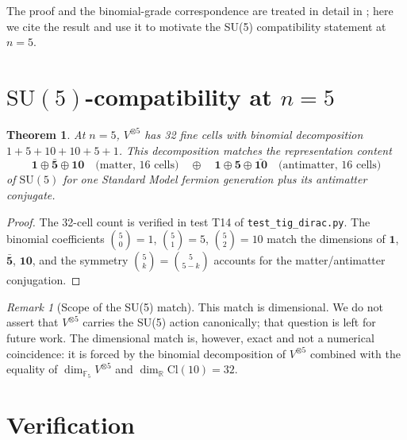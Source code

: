 \documentclass[11pt,reqno]{amsart}
\theoremstyle{plain}
\newtheorem{theorem}{Theorem}[section]
\theoremstyle{definition}
\theoremstyle{remark}
\newtheorem*{remark}{Remark}
\newcommand{\F}{\mathbb{F}}
\newcommand{\R}{\mathbb{R}}
\newcommand{\Cl}{\mathrm{Cl}}
\begin{document}
The proof and the binomial-grade correspondence are treated in detail
in \cite{SandersGishCliffordLadder}; here we cite the result and use
it to motivate the SU(5) compatibility statement at $n = 5$.

\section{$\mathrm{SU}(5)$-compatibility at $n=5$}
\label{sec:su5}

\begin{theorem}\label{thm:su5}
At $n=5$, $V^{\otimes 5}$ has 32 fine cells with binomial decomposition
$1 + 5 + 10 + 10 + 5 + 1$. This decomposition matches the representation
content
\[
\mathbf{1} \oplus \bar{\mathbf{5}} \oplus \mathbf{10}
\quad \text{(matter, 16 cells)} \quad \oplus \quad
\mathbf{1} \oplus \mathbf{5} \oplus \bar{\mathbf{10}}
\quad \text{(antimatter, 16 cells)}
\]
of $\mathrm{SU}(5)$ for one Standard Model fermion generation plus its
antimatter conjugate.
\end{theorem}

\begin{proof}
The 32-cell count is verified in test T14 of \texttt{test\_tig\_dirac.py}.
The binomial coefficients $\binom{5}{0} = 1$, $\binom{5}{1} = 5$,
$\binom{5}{2} = 10$ match the dimensions of $\mathbf{1}$, $\bar{\mathbf{5}}$,
$\mathbf{10}$, and the symmetry $\binom{5}{k} = \binom{5}{5-k}$ accounts
for the matter/antimatter conjugation.
\end{proof}

\begin{remark}[Scope of the SU(5) match]
This match is dimensional. We do not assert that $V^{\otimes 5}$
carries the SU(5) action canonically; that question is left for future
work. The dimensional match is, however, exact and not a numerical
coincidence: it is forced by the binomial decomposition of $V^{\otimes 5}$
combined with the equality of $\dim_{\F_5} V^{\otimes 5}$ and
$\dim_\R \Cl(10) = 32$.
\end{remark}

\section{Verification}
\label{sec:verification}
\end{document}
